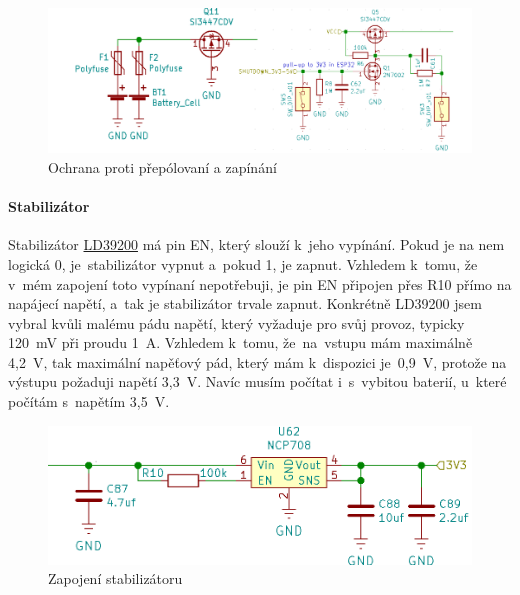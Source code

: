 \begin{figure}[h]
    \centering
    \includegraphics[width=\textwidth]{kapitoly/obrazky/E4/napajeni/ochrana_proti_prepolovani_a_zapinani.png}
    \caption{Ochrana proti přepólovaní a zapínání}
    \label{fig:E4-zapinani}
\end{figure}

\newpage

\paragraph*{Stabilizátor}

Stabilizátor \href{https://datasheet.lcsc.com/szlcsc/1808280153_STMicroelectronics-LD39200PU33R_C222192.pdf}{LD39200} \parencite{ld39200} má pin EN, který slouží k~je\-ho vypínání. 
Pokud je na nem logická 0, je~stabilizátor vypnut a~pokud 1, je zapnut. Vzhledem k~tomu, že v~mém zapojení toto vypínaní nepotřebuji, je pin EN připojen 
přes R10 přímo na napájecí napětí, a~tak je stabilizátor trvale zapnut.
Konkrétně LD39200 jsem vybral kvůli malému pádu napětí, který vyžaduje pro svůj provoz, typicky 120~mV při proudu 1~A. Vzhledem k~tomu, že~na~vstupu 
mám maximálně 4,2~V, tak maximální napěťový pád, který mám k~dispozici je~0,9~V, protože na výstupu požaduji napětí 3,3~V. Navíc musím počítat 
i~s~vybitou baterií, u~které počítám s~napětím 3,5~V. %

\begin{figure}[htbp]
    \centering
    \includegraphics[width=400pt]{kapitoly/obrazky/E4/napajeni/stabilizator.png}
    \caption{Zapojení stabilizátoru}
    \label{fig:E4-stabilizator}
\end{figure}


